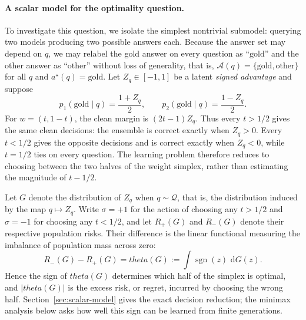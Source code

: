 \documentclass[11pt]{article}
\def\theta{theta}%
\newcommand{\sgn}{\operatorname{sgn}}
\newcommand{\calQ}{\mathcal Q}
\newcommand{\dd}{\,\mathrm d}
\newcommand\ced[1]{{\color{teal!70!black} #1}}
\begin{document}
\paragraph{A scalar model for the optimality question.}
To investigate this question, we isolate the simplest nontrivial submodel: querying two models producing two possible answers each.  Because the answer set may depend on $q$, we may relabel the gold answer on every question as ``$\mathrm{gold}$'' and the other answer as ``$\mathrm{other}$'' without loss of generality, that is, $\mathcal A(q) = \{\mathrm{gold}, \mathrm{other}\}$ for all $q$ and $a^\star(q) = \mathrm{gold}$.  Let $Z_q\in[-1,1]$ be a latent \emph{signed advantage} and suppose
\begin{equation}
\label{eq:intro-antisymmetric}
p_1(\mathrm{gold}\mid q)=\frac{1+Z_q}{2},
\qquad
p_2(\mathrm{gold}\mid q)=\frac{1-Z_q}{2}.
\end{equation}
For $w=(t,1-t)$, the clean margin is $(2t-1)Z_q$.  Thus every $t>1/2$ gives the same clean decisions: the ensemble is correct exactly when $Z_q>0$.  Every $t<1/2$ gives the opposite decisions and is correct exactly when $Z_q<0$, while $t=1/2$ ties on every question.  The learning problem therefore reduces to choosing between the two halves of the weight simplex, rather than estimating the magnitude of $t-1/2$.

Let $G$ denote the distribution of $Z_q$ when $q\sim\calQ$, that is, the distribution induced by the map $q\mapsto Z_q$.  Write $\sigma=+1$ for the action of choosing any $t>1/2$ and $\sigma=-1$ for choosing any $t<1/2$, and let $R_+(G)$ and $R_-(G)$ denote their respective population risks.  Their difference is \ced{the linear functional measuring the imbalance of population mass across zero:}
\begin{equation}
\label{eq:intro-theta}
R_-(G)-R_+(G)
=
\theta(G)
:=
\int\sgn(z)\,\dd G(z).
\end{equation}
Hence the sign of $\theta(G)$ determines which half of the simplex is optimal, and $|\theta(G)|$ is \ced{the excess risk, or regret, incurred by} choosing the wrong half.  Section~\ref{sec:scalar-model} gives the exact decision reduction; the minimax analysis below asks how well this sign can be learned from finite generations.
\end{document}
